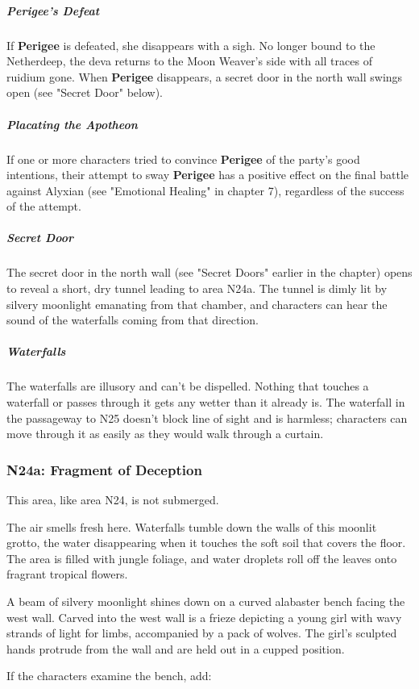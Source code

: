 \documentclass[10pt,a4paper,twoside,fancy,bg=print,twocolumn,openany,nodeprecatedcode]{dndbook}
\begin{document}
\subparagraph{Perigee's Defeat}
If \textbf{Perigee} is defeated, she disappears with a sigh. No longer bound to the Netherdeep, the deva returns to the Moon Weaver's side with all traces of ruidium gone. When \textbf{Perigee} disappears, a secret door in the north wall swings open (see "Secret Door" below).

\subparagraph{Placating the Apotheon}
If one or more characters tried to convince \textbf{Perigee} of the party's good intentions, their attempt to sway \textbf{Perigee} has a positive effect on the final battle against Alyxian (see "Emotional Healing" in chapter 7), regardless of the success of the attempt.

\subparagraph{Secret Door}
The secret door in the north wall (see "Secret Doors" earlier in the chapter) opens to reveal a short, dry tunnel leading to area N24a. The tunnel is dimly lit by silvery moonlight emanating from that chamber, and characters can hear the sound of the waterfalls coming from that direction.

\subparagraph{Waterfalls}
The waterfalls are illusory and can't be dispelled. Nothing that touches a waterfall or passes through it gets any wetter than it already is. The waterfall in the passageway to N25 doesn't block line of sight and is harmless; characters can move through it as easily as they would walk through a curtain.

\subsubsection{N24a: Fragment of Deception}
This area, like area N24, is not submerged.

\begin{DndReadAloud}{}
The air smells fresh here. Waterfalls tumble down the walls of this moonlit grotto, the water disappearing when it touches the soft soil that covers the floor. The area is filled with jungle foliage, and water droplets roll off the leaves onto fragrant tropical flowers.

A beam of silvery moonlight shines down on a curved alabaster bench facing the west wall. Carved into the west wall is a frieze depicting a young girl with wavy strands of light for limbs, accompanied by a pack of wolves. The girl's sculpted hands protrude from the wall and are held out in a cupped position.

\end{DndReadAloud}

If the characters examine the bench, add:
\end{document}
